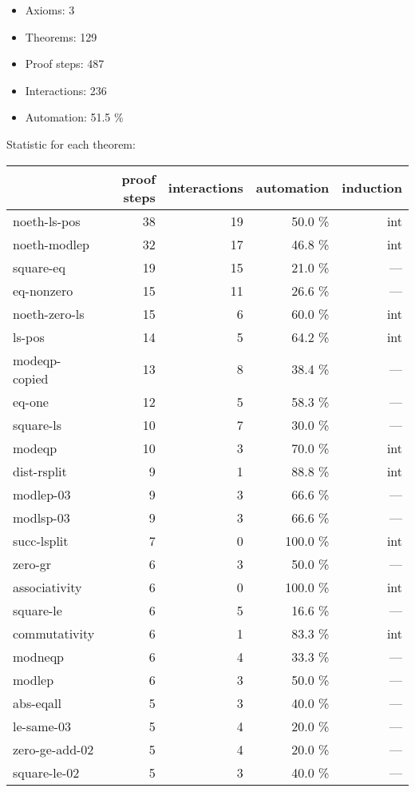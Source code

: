 \documentclass[a4paper]{article}
\begin{document}
\raggedright
              
\begin{itemize}
\item Axioms: 3
\item Theorems: 129
\item Proof steps: 487
\item Interactions: 236
\item Automation: 51.5 \%
\end{itemize}


Statistic for each theorem:

\begin{supertabular}{l|r|r|r|r}
	& proof steps & interactions & automation & induction\\ \hline
noeth-ls-pos & 38 & 19 & 50.0 \% & int\\
noeth-modlep & 32 & 17 & 46.8 \% & int\\
square-eq & 19 & 15 & 21.0 \% & ---\\
eq-nonzero & 15 & 11 & 26.6 \% & ---\\
noeth-zero-ls & 15 & 6 & 60.0 \% & int\\
ls-pos & 14 & 5 & 64.2 \% & int\\
modeqp-copied & 13 & 8 & 38.4 \% & ---\\
eq-one & 12 & 5 & 58.3 \% & ---\\
square-ls & 10 & 7 & 30.0 \% & ---\\
modeqp & 10 & 3 & 70.0 \% & int\\
dist-rsplit & 9 & 1 & 88.8 \% & int\\
modlep-03 & 9 & 3 & 66.6 \% & ---\\
modlsp-03 & 9 & 3 & 66.6 \% & ---\\
succ-lsplit & 7 & 0 & 100.0 \% & int\\
zero-gr & 6 & 3 & 50.0 \% & ---\\
associativity & 6 & 0 & 100.0 \% & int\\
square-le & 6 & 5 & 16.6 \% & ---\\
commutativity & 6 & 1 & 83.3 \% & int\\
modneqp & 6 & 4 & 33.3 \% & ---\\
modlep & 6 & 3 & 50.0 \% & ---\\
abs-eqall & 5 & 3 & 40.0 \% & ---\\
le-same-03 & 5 & 4 & 20.0 \% & ---\\
zero-ge-add-02 & 5 & 4 & 20.0 \% & ---\\
square-le-02 & 5 & 3 & 40.0 \% & ---\\

\end{supertabular}
\end{document}
